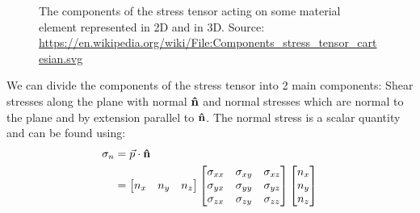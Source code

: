\documentclass[11pt, a4paper]{article}
\DeclareRobustCommand{\uvec}[1]{{%
  \ifcat\relax\noexpand#1%
    \bm{\hat{#1}}%
  \else
    \ifcsname uvec#1\endcsname
      \csname uvec#1\endcsname
    \else
      \bm{\hat{\mathbf{#1}}}%
     \fi
   \fi
}}
\numberwithin{equation}{section}
\numberwithin{figure}{section}
\begin{document}
\begin{figure}[H]
  \centering
  \qquad
  \caption{The components of the stress tensor acting on some material element represented in 2D and in 3D. Source: \url{https://en.wikipedia.org/wiki/File:Components_stress_tensor_cartesian.svg}}
\end{figure}
We can divide the components of the stress tensor into 2 main components: Shear stresses along the plane with normal $\uvec{n}$ and normal stresses which are normal to the plane and by extension parallel to $\uvec{n}$. The normal stress is a scalar quantity and can be found using:
\begin{align}
  \sigma_n &= \vec{p} \cdot \uvec{n} \notag\\
           &=
  \begin{bmatrix}
    n_x &
    n_y &
    n_z
  \end{bmatrix}
  \begin{bmatrix}
    \sigma_{xx} & \sigma_{xy} & \sigma_{xz} \\
    \sigma_{yx} & \sigma_{yy} & \sigma_{yz} \\
    \sigma_{zx} & \sigma_{zy} & \sigma_{zz} \\
  \end{bmatrix}
  \begin{bmatrix}
    n_x\\
    n_y\\
    n_z
  \end{bmatrix}
\end{align}
\end{document}
